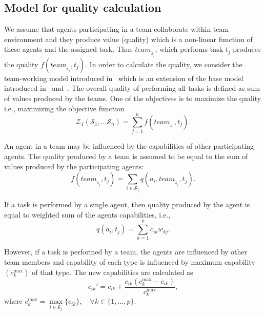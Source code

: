 \documentclass{sig-alternate}
\begin{document}
\subsection{Model for quality calculation}
We assume that agents participating in a team collaborate within team 
environment and they produce value (quality) which is a non-linear function of 
these agents and the assigned task. 
Thus $team_{_{\mathcal{S}_j}}$, which performs 
task $t_j$ produces the quality $f(team_{_{\mathcal{S}_j}}, t_j)$. 
In order to calculate the quality, we consider the team-working model 
introduced in~\cite{irfan2011} which is an extension of the base model 
introduced in~\cite{kamrani2009} and~\cite{kamrani2010}. 
The overall quality of performing all tasks is defined as sum of values 
produced by the teams. One of the objectives is to maximize the 
quality i.e., maximizing the objective function
\begin{equation}\label{equ: objective}
\mathcal{Z}_1(\mathcal{S}_1, \dots \mathcal{S}_n) 
= \sum_{j=1}^n f({team_{_{\mathcal{S}_j}}, t_j}).
\end{equation}

An agent in a team may be influenced by the capabilities of other 
participating agents. The quality produced by a team is assumed to be equal 
to the sum of values produced by the participating agents:
\begin{equation}\label{equ: value_function}
  f(team_{_{\mathcal{S}_j}}, t_j) = \sum_{i \in \mathcal{S}_j} 
  q(a_i, team_{_{\mathcal{S}_j}}, t_j).
\end{equation}

If a task is performed by a single agent, then quality produced by the agent 
is equal to weighted sum of the agents capabilities, i.e.,
\begin{equation}\label{equ: single}
  q(a_i, t_j) = \sum_{k=1}^p c_{ik} w_{kj}. 
\end{equation}  

However, if a task is performed by a team, the agents are influenced by other 
team members and capability of each type is influenced by maximum 
capability $(c_k^{\max})$ of that type. 
The new capabilities are calculated as
\begin{equation}\label{equ: boost} 
  c_{ik}' = c_{ik} + \frac{c_{ik}(c_k^{\max}-c_{ik})}{c_k^{\max}},
\end{equation}
where $c_k^{\max}  =\underset{i \in \mathcal{S}_j}{\max} \{c_{ik}\}, 
\quad \forall k \in \{1, \dots, p\}.$ 
\end{document}
